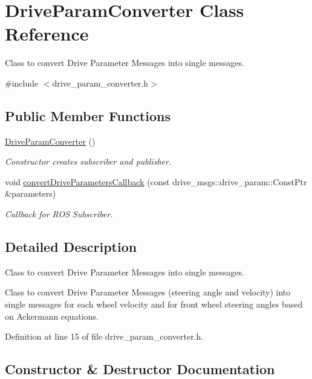 \hypertarget{class_drive_param_converter}{}\section{Drive\+Param\+Converter Class Reference}
\label{class_drive_param_converter}


Class to convert Drive Parameter Messages into single messages.  




{\ttfamily \#include $<$drive\+\_\+param\+\_\+converter.\+h$>$}

\subsection*{Public Member Functions}
\begin{DoxyCompactItemize}
\item 
\hyperlink{class_drive_param_converter_a6e00a5ff69b667c7a65dab5b59a1ccb7}{Drive\+Param\+Converter} ()
\begin{DoxyCompactList}\small\item\em Constructor creates subscriber and publisher. \end{DoxyCompactList}\item 
void \hyperlink{class_drive_param_converter_aa101cfe15a7358f7816f9d6a14fd4261}{convert\+Drive\+Parameters\+Callback} (const drive\+\_\+msgs\+::drive\+\_\+param\+::\+Const\+Ptr \&parameters)
\begin{DoxyCompactList}\small\item\em Callback for R\+OS Subscriber. \end{DoxyCompactList}\end{DoxyCompactItemize}


\subsection{Detailed Description}
Class to convert Drive Parameter Messages into single messages. 

Class to convert Drive Parameter Messages (steering angle and velocity) into single messages for each wheel velocity and for front wheel steering angles based on Ackermann equations. 

Definition at line 15 of file drive\+\_\+param\+\_\+converter.\+h.



\subsection{Constructor \& Destructor Documentation}
